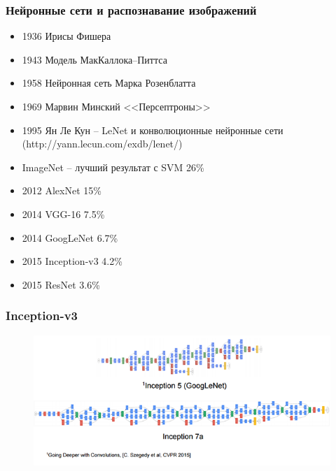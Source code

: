 \documentclass[fullscreen=true, bookmarks=false]{beamer} %
\begin{document}
\begin{frame}{}
\frametitle{Нейронные сети и распознавание изображений}

\begin{itemize}
\item 1936 Ирисы Фишера
\item 1943 Модель МакКаллока--Питтса
\item 1958 Нейронная сеть Марка Розенблатта
\item 1969 Марвин Минский <<Персептроны>>
\item 1995 Ян Ле Кун -- LeNet и конволюционные нейронные сети (http://yann.lecun.com/exdb/lenet/)
\item ImageNet -- лучший результат с SVM 26\%
\item 2012 AlexNet 15\%
\item 2014 VGG-16 7.5\% 
\item 2014 GoogLeNet 6.7\% 
\item 2015 Inception-v3 4.2\%
\item 2015 ResNet 3.6\%
\end{itemize}
\end{frame}


\begin{frame}{}
\frametitle{Inception-v3}
\begin{figure}[]
\includegraphics[scale=0.5]{inception} 
\end{figure}
\end{frame}

\end{document}
